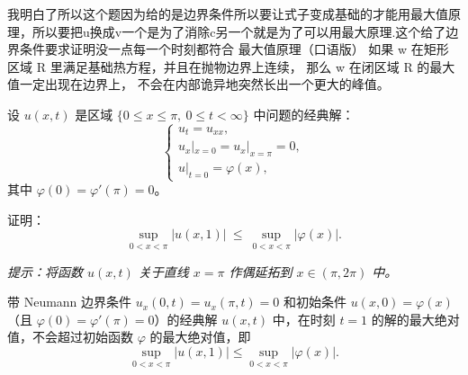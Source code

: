 \begin{dxtips}
    我明白了所以这个题因为给的是边界条件所以要让式子变成基础的才能用最大值原理，所以要把u换成v一个是为了消除c另一个就是为了可以用最大原理.这个给了边界条件要求证明没一点每一个时刻都符合
    最大值原理（口语版）
如果 w 在矩形区域 R 里满足基础热方程，并且在抛物边界上连续，
那么 w 在闭区域 \overline R 的最大值一定出现在边界上，
不会在内部诡异地突然长出一个更大的峰值。

\end{dxtips}

\begin{homework}[5]
设 $u(x,t)$ 是区域 $\{0\le x\le \pi,\ 0\le t<\infty\}$ 中问题的经典解：
\[
\begin{cases}
u_t=u_{xx},\\[4pt]
u_x|_{x=0}=u_x|_{x=\pi}=0,\\[4pt]
u|_{t=0}=\varphi(x),
\end{cases}
\]
其中 $\varphi(0)=\varphi'(\pi)=0$。

证明：
\[
\sup_{0<x<\pi}|u(x,1)|\ \le\ \sup_{0<x<\pi}|\varphi(x)|.
\]

\textit{提示：将函数 $u(x,t)$ 关于直线 $x=\pi$ 作偶延拓到 $x\in(\pi,2\pi)$ 中。}
\end{homework}
\begin{dxtips}[证明目的]
    带 Neumann 边界条件 $u_x(0,t)=u_x(\pi,t)=0$ 和初始条件 $u(x,0)=\varphi(x)$（且 $\varphi(0)=\varphi'(\pi)=0$）的经典解 $u(x,t)$ 中，在时刻 $t=1$ 的解的最大绝对值，不会超过初始函数 $\varphi$ 的最大绝对值，即
\[
\sup_{0<x<\pi} |u(x,1)| \le \sup_{0<x<\pi} |\varphi(x)|.
\]
\end{dxtips}

